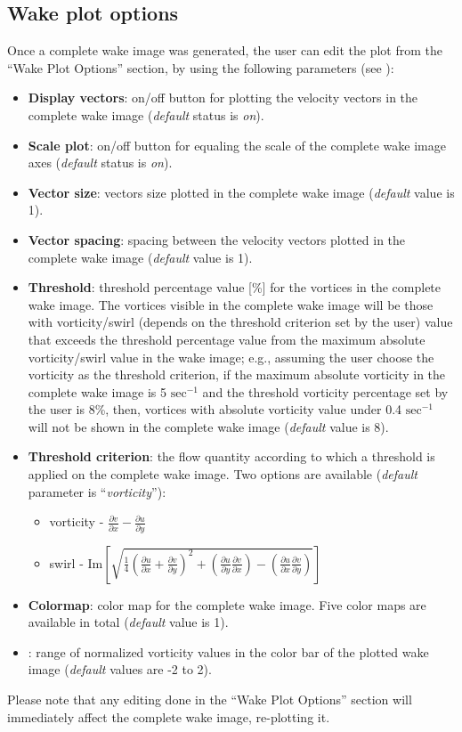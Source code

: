 \documentclass[12pt,a4paper]{article}
\begin{document}
 \newpage
 \subsection{Wake plot options}
Once a complete wake image was generated, the user can edit the plot from the ``Wake Plot Options'' section, by using the following parameters (see ):
\begin{itemize}
	\item \textbf{Display vectors}: on/off button for plotting the velocity vectors in the complete wake image (\textit{default} status is \textit{on}).
	\item \textbf{Scale plot}: on/off button for equaling the scale of the complete wake image axes (\textit{default} status is \textit{on}).
	\item \textbf{Vector size}: vectors size plotted in the complete wake image (\textit{default} value is 1).
	\item \textbf{Vector spacing}: spacing between the velocity vectors plotted in the complete wake image (\textit{default} value is 1).
	\item \textbf{Threshold}: threshold percentage value [\%] for the vortices in the complete wake image. The vortices visible in the complete wake image will be those with vorticity/swirl (depends on the threshold criterion set by the user) value that exceeds the threshold percentage value from the maximum absolute vorticity/swirl value in the wake image; e.g., assuming the user choose the vorticity as the threshold criterion, if the maximum absolute vorticity in the complete wake image is 5 $\mathrm{sec^{-1}}$ and the threshold vorticity percentage set by the user is 8\%, then, vortices with absolute vorticity value under 0.4 $\mathrm{sec^{-1}}$ will not be shown in the complete wake image (\textit{default} value is 8).
	\item \textbf{Threshold criterion}: the flow quantity according to which a threshold is applied on the complete wake image. Two options are available (\textit{default} parameter is ``\textit{vorticity}''): 
	\begin{itemize}
		\item vorticity - $\frac{\partial v}{\partial x} - \frac{\partial u}{\partial y}$
		\item swirl - $\bm{\mathrm{Im}}\left[ \sqrt{ \frac{1}{4}\left(\frac{\partial u}{\partial x} + \frac{\partial v}{\partial y}\right)^2+ \left(\frac{\partial u}{\partial y} \frac{\partial v}{\partial x} \right) - \left(\frac{\partial u}{\partial x} \frac{\partial v}{\partial y} \right)}  \right]$ 
	\end{itemize}
	\item \textbf{Colormap}: color map for the complete wake image. Five color maps are available in total (\textit{default} value is 1).
	\item {}: range of normalized vorticity values in the color bar of the plotted wake image (\textit{default} values are -2 to 2).
\end{itemize}
Please note that any editing done in the ``Wake Plot Options'' section will immediately affect the complete wake image, re-plotting it.
\end{document}
